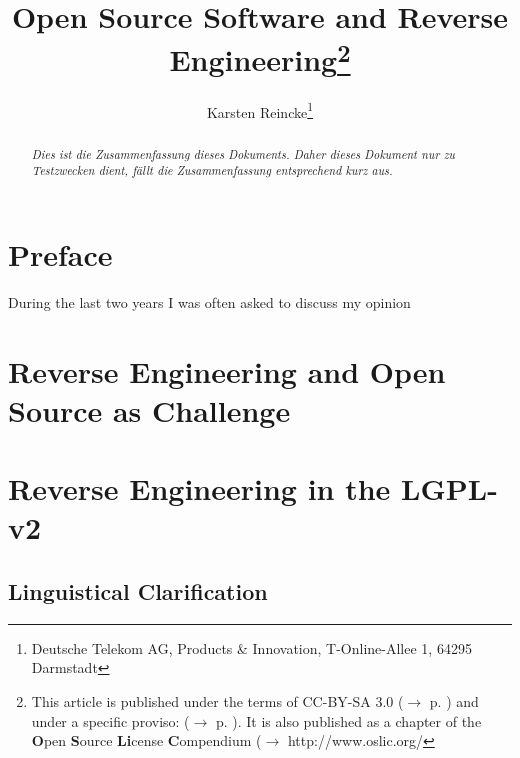 \documentclass[DIV=calc,BCOR=5mm,12pt,headings=small,oneside,toc=bib]{scrartcl}
\begin{document}

\titlehead{Version 1.0}

\subject{\small \itshape How to Achieve Open Source License Compliance} 

\title{Open Source Software and Reverse Engineering\footnote{This article is
published under the terms of CC-BY-SA 3.0 ($\rightarrow$ p. \pageref{License})
and under a specific proviso: ($\rightarrow$ p. \pageref{Disclaimer}). It is
also published as a chapter of the \textbf{O}pen \textbf{S}ource
\textbf{Li}cense \textbf{C}ompendium ($\rightarrow$ http://www.oslic.org/}}

\author{
Karsten Reincke\thanks{Deutsche Telekom AG, Products \& Innovation, 
T-Online-Allee 1, 64295 Darmstadt}
}

\maketitle

\normalsize

\begin{abstract}\noindent\emph{Dies ist die Zusammenfassung dieses Dokuments.
Daher dieses Dokument nur zu Testzwecken dient, fällt die Zusammenfassung
entsprechend kurz aus.}
\end{abstract}

\section{Preface}

During the last two years I was often asked to discuss my opinion

\footnotesize
\tableofcontents


\section{Reverse Engineering and Open Source as Challenge}

\section{Reverse Engineering in the LGPL-v2}

\subsection{Linguistical Clarification}

\end{document}
